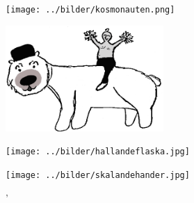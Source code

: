 \sclearpage

\sclearpage

\sclearpage

\sclearpage


\sclearpage


%
\sclearpage


\sclearpage


\sclearpage

\sclearpage

\begin{intersong}
\begin{center}
\texttt{[image: ../bilder/kosmonauten.png]} 
\end{center}
\end{intersong}
\vspace{25mm}

\begin{intersong}
\begin{center}
\includegraphics[width=6cm]{../bilder/fardigabilder/CamillasFardigaBilder/Isbjorn2.png} 
\end{center}
\end{intersong}
\sclearpage
\sclearpage


\sclearpage

\sclearpage

\begin{intersong}
\begin{center}
\texttt{[image: ../bilder/hallandeflaska.jpg]} 
\end{center}
\end{intersong}
\sclearpage

\sclearpage

\begin{intersong}
%
\begin{center}
\texttt{[image: ../bilder/skalandehander.jpg]} 
\end{center}
\end{intersong}
\sclearpage
'
